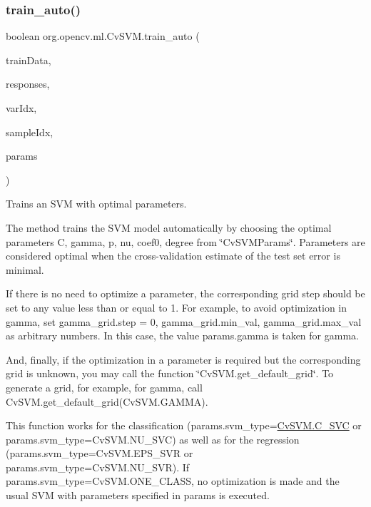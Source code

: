 \subsubsection{\texorpdfstring{train\+\_\+auto()}{train\_auto()}\hspace{0.1cm}{\footnotesize\ttfamily [2/2]}}
{\footnotesize\ttfamily boolean org.\+opencv.\+ml.\+Cv\+S\+V\+M.\+train\+\_\+auto (\begin{DoxyParamCaption}\item[{\mbox{\hyperlink{classorg_1_1opencv_1_1core_1_1_mat}{Mat}}}]{train\+Data,  }\item[{\mbox{\hyperlink{classorg_1_1opencv_1_1core_1_1_mat}{Mat}}}]{responses,  }\item[{\mbox{\hyperlink{classorg_1_1opencv_1_1core_1_1_mat}{Mat}}}]{var\+Idx,  }\item[{\mbox{\hyperlink{classorg_1_1opencv_1_1core_1_1_mat}{Mat}}}]{sample\+Idx,  }\item[{\mbox{\hyperlink{classorg_1_1opencv_1_1ml_1_1_cv_s_v_m_params}{Cv\+S\+V\+M\+Params}}}]{params }\end{DoxyParamCaption})}

Trains an S\+VM with optimal parameters.

The method trains the S\+VM model automatically by choosing the optimal parameters {\ttfamily C}, {\ttfamily gamma}, {\ttfamily p}, {\ttfamily nu}, {\ttfamily coef0}, {\ttfamily degree} from \char`\"{}\+Cv\+S\+V\+M\+Params\char`\"{}. Parameters are considered optimal when the cross-\/validation estimate of the test set error is minimal.

If there is no need to optimize a parameter, the corresponding grid step should be set to any value less than or equal to 1. For example, to avoid optimization in {\ttfamily gamma}, set {\ttfamily gamma\+\_\+grid.\+step = 0}, {\ttfamily gamma\+\_\+grid.\+min\+\_\+val}, {\ttfamily gamma\+\_\+grid.\+max\+\_\+val} as arbitrary numbers. In this case, the value {\ttfamily params.\+gamma} is taken for {\ttfamily gamma}.

And, finally, if the optimization in a parameter is required but the corresponding grid is unknown, you may call the function \char`\"{}\+Cv\+S\+V\+M.\+get\+\_\+default\+\_\+grid\char`\"{}. To generate a grid, for example, for {\ttfamily gamma}, call {\ttfamily Cv\+S\+V\+M.\+get\+\_\+default\+\_\+grid(Cv\+S\+V\+M.\+G\+A\+M\+MA)}.

This function works for the classification ({\ttfamily params.\+svm\+\_\+type=\mbox{\hyperlink{classorg_1_1opencv_1_1ml_1_1_cv_s_v_m_a8f904304af3689654b3d7de34ae54801}{Cv\+S\+V\+M.\+C\+\_\+\+S\+VC}}} or {\ttfamily params.\+svm\+\_\+type=Cv\+S\+V\+M.\+N\+U\+\_\+\+S\+VC}) as well as for the regression ({\ttfamily params.\+svm\+\_\+type=Cv\+S\+V\+M.\+E\+P\+S\+\_\+\+S\+VR} or {\ttfamily params.\+svm\+\_\+type=Cv\+S\+V\+M.\+N\+U\+\_\+\+S\+VR}). If {\ttfamily params.\+svm\+\_\+type=Cv\+S\+V\+M.\+O\+N\+E\+\_\+\+C\+L\+A\+SS}, no optimization is made and the usual S\+VM with parameters specified in {\ttfamily params} is executed.


